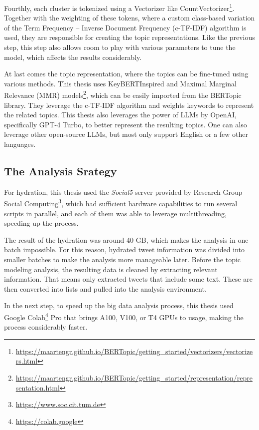 Fourthly, each cluster is tokenized using a Vectorizer like 
CountVectorizer\footnote{\url{https://maartengr.github.io/BERTopic/getting_started/vectorizers/vectorizers.html}}. 
Together with the weighting of these tokens, where a custom 
class-based variation of the Term Frequency -- Inverse Document Frequency (c-TF-IDF) algorithm 
is used, they are responsible for creating the topic representations. 
Like the previous step, this step also allows room to play with various parameters 
to tune the model, which affects the results considerably.

At last comes the topic representation, where the topics can be fine-tuned 
using various methods. This thesis uses KeyBERTInspired and Maximal Marginal Relevance (MMR) 
models\footnote{\url{https://maartengr.github.io/BERTopic/getting_started/representation/representation.html}}, 
which can be easily imported from the BERTopic library. They leverage the c-TF-IDF algorithm 
and weights keywords to represent the related topics. 
This thesis also leverages the power of LLMs by OpenAI, specifically GPT-4 Turbo, 
to better represent the resulting topics. One can also leverage other open-source LLMs, 
but most only support English or a few other languages.

\subsection{The Analysis Srategy}

For hydration, this thesis used the \textit{Social5} server provided by Research Group Social 
Computing\footnote{\url{https://www.soc.cit.tum.de}}, which had sufficient hardware 
capabilities to run several scripts in parallel, and each of them was able to leverage 
multithreading, speeding up the process.

The result of the hydration was around 40 GB, which makes the analysis in one batch impossible. 
For this reason, hydrated tweet information was divided into smaller batches to make the 
analysis more manageable later.
Before the topic modeling analysis, the resulting data is cleaned by extracting relevant 
information. That means only extracted tweets that include some text. These are then 
converted into lists and pulled into the analysis environment.

In the next step, to speed up the big data analysis process, this thesis used Google 
Colab\footnote{\url{https://colab.google}} Pro that brings A100, V100, or T4 GPUs to usage, 
making the process considerably faster. 

